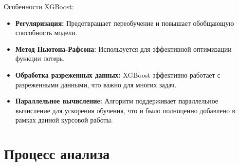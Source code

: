 \documentclass[14pt, a4paper]{../cls/coursework}
\begin{document}
    Особенности XGBoost:

    \begin{itemize}
        \item \textbf{Регуляризация:} Предотвращает переобучение и повышает обобщающую способность модели.
        \item \textbf{Метод Ньютона-Рафсона:} Используется для эффективной оптимизации функции потерь.
        \item \textbf{Обработка разреженных данных:} XGBoost эффективно работает с разреженными данными, что важно для многих задач.
        \item \textbf{Параллельное вычисление:} Алгоритм поддерживает параллельное вычисление для ускорения обучения, что и было полноценно добавлено в рамках данной курсовой работы.
    \end{itemize}

    \section{Процесс анализа}
\end{document}

